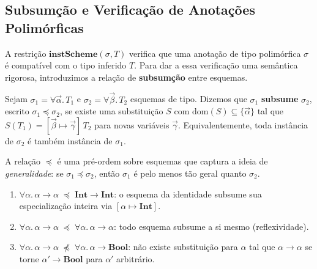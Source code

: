   \subsection{Subsumção e Verificação de Anotações Polimórficas}
  \label{sec:subsumption}

  A restrição \(\mathbf{instScheme}(\sigma, T)\) verifica que uma
  anotação de tipo polimórfica \(\sigma\) é compatível com o tipo
  inferido \(T\). Para dar a essa verificação uma semântica rigorosa,
  introduzimos a relação de \textbf{subsumção} entre esquemas.

  \begin{Definition}[Subsumção]\label{def:subsumption}
    Sejam \(\sigma_1 = \forall \vec{\alpha}.\, T_1\) e
    \(\sigma_2 = \forall \vec{\beta}.\, T_2\) esquemas de tipo.
    Dizemos que \(\sigma_1\) \textbf{subsume} \(\sigma_2\), escrito
    \(\sigma_1 \preceq \sigma_2\), se existe uma substituição \(S\) com
    \(\mathrm{dom}(S) \subseteq \{\vec{\alpha}\}\) tal que
    \(S(T_1) = [\vec{\beta} \mapsto \vec{\gamma}]\,T_2\) para novas variáveis
    \(\vec{\gamma}\).  Equivalentemente, toda instância de
    \(\sigma_2\) é também instância de \(\sigma_1\).
  \end{Definition}

  A relação \(\preceq\) é uma pré-ordem sobre esquemas que captura a
  ideia de \emph{generalidade}: se \(\sigma_1 \preceq \sigma_2\), então
  \(\sigma_1\) é pelo menos tão geral quanto \(\sigma_2\).

  \begin{example}
    \begin{enumerate}
      \item \(\forall \alpha.\, \alpha \to \alpha \;\preceq\;
        \mathbf{Int} \to \mathbf{Int}\): o esquema da identidade
        subsume sua especialização inteira via
        \([\alpha \mapsto \mathbf{Int}]\).
      \item \(\forall \alpha.\, \alpha \to \alpha \;\preceq\;
        \forall \alpha.\, \alpha \to \alpha\): todo esquema subsume a
        si mesmo (reflexividade).
      \item \(\forall \alpha.\, \alpha \to \alpha \;\not\preceq\;
        \forall \alpha.\, \alpha \to \mathbf{Bool}\): não existe
        substituição para \(\alpha\) tal que \(\alpha \to \alpha\)
        se torne \(\alpha' \to \mathbf{Bool}\) para \(\alpha'\)
        arbitrário.
    \end{enumerate}
  \end{example}

